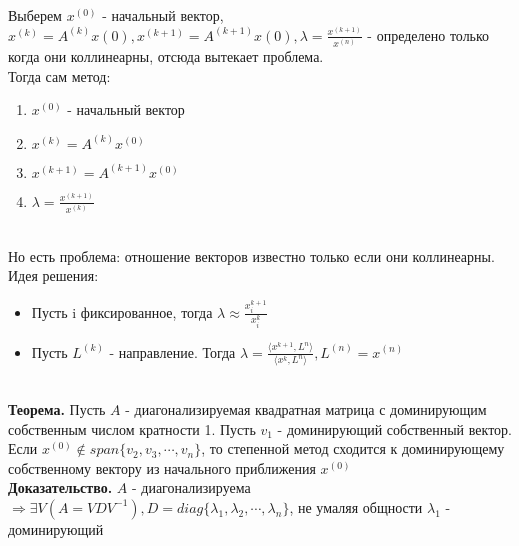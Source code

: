     Выберем \(x^{(0)}\) - начальный вектор,\( x^{(k)} = A^{(k)}x{(0)}, x^{(k + 1)} = A^{(k + 1)}x{(0)}, \lambda = \frac{x^{(k+1)}}{x^{(n)}}\) - определено только когда они коллинеарны, отсюда вытекает проблема. \\
    Тогда сам метод: 
    \begin{enumerate}
        \item $x^{(0)}$ - начальный вектор 
        \item $x^{(k)} = A^{(k)}x^{(0)}$
        \item $x^{(k+1)} = A^{(k+1)}x^{(0)}$
        \item $\lambda = \frac{x^{(k+1)}}{x^{(k)}}$
    \end{enumerate}
    \\  
    Но есть проблема: отношение векторов известно только если они коллинеарны.
    \\ Идея решения:
    \begin{itemize}
        \item Пусть i фиксированное, тогда \(\lambda \approx \frac{x_i^{k+1}}{x_i^{k}}\)
        \item Пусть \(L^{(k)}\) - направление. Тогда \(\lambda = \frac{\langle x^{k+1}, L^{n} \rangle}{\langle x^{k}, L^{n} \rangle}, L^{(n)} = x^{(n)}\)
    \end{itemize} \\

    \textbf{Теорема.} Пусть \(A\) - диагонализируемая квадратная матрица с доминирующим собственным числом кратности 1. Пусть \(v_1\) - доминирующий собственный вектор. Если \(x^{(0)} \notin span\{v_2,v_3,\cdots,v_n\}\), то степенной метод сходится к доминирующему собственному вектору из начального приближения \(x^{(0)}\) \\

    \textbf{Доказательство.} \(A\) - диагонализируема \(\Rightarrow \exists V(A = VDV^{-1}), D = diag \{\lambda_1, \lambda_2, \cdots, \lambda_n\}\), не умаляя общности \(\lambda_1\) - доминирующий \\

